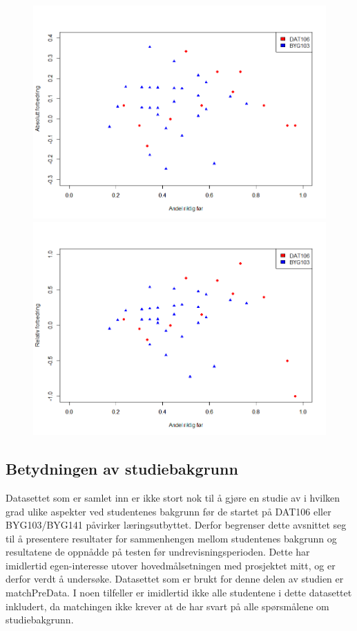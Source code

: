 \documentclass[a4paper,norsk,12pt]{report}
\begin{document}
\begin{figure}[p]
	\includegraphics[width=.48\textwidth]{./absoluttForbedringScatter}
	\includegraphics[width=.48\textwidth]{./relativForbedringScatter}
	\caption{}
	\label{fig:scatter}
\end{figure}

\subsection{Betydningen av studiebakgrunn}
Datasettet som er samlet inn er ikke stort nok til å gjøre en studie av i hvilken grad ulike aspekter ved studentenes bakgrunn før de startet på DAT106 eller BYG103/BYG141 påvirker læringsutbyttet. Derfor begrenser dette avsnittet seg til å presentere resultater for sammenhengen mellom studentenes bakgrunn og resultatene de oppnådde på testen før undrevisningsperioden. Dette har imidlertid egen-interesse utover hovedmålsetningen med prosjektet mitt, og er derfor verdt å undersøke. Datasettet som er brukt for denne delen av studien er matchPreData. I noen tilfeller er imidlertid ikke alle studentene i dette datasettet inkludert, da matchingen ikke krever at de har svart på alle spørsmålene om studiebakgrunn.
\end{document}
